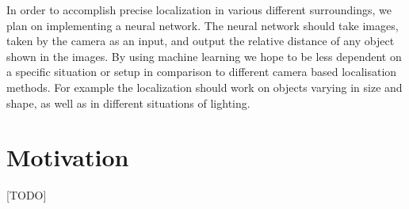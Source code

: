 In order to accomplish precise localization in various different surroundings, we plan on implementing a neural network. The neural network should take images, taken by the camera as an input, and output the relative distance of any object shown in the images. By using machine learning we hope to be less dependent on a specific situation or setup in comparison to different camera based localisation methods. For example the localization should work on objects varying in size and shape, as well as in different situations of lighting.

\section{Motivation}
[TODO]

\filbreak
